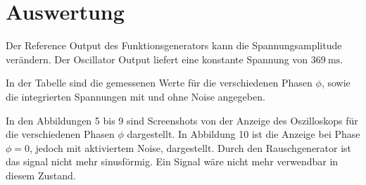 \section{Auswertung}
\label{sec:Auswertung}

Der Reference Output des Funktionsgenerators kann die Spannungsamplitude verändern. Der Oscillator Output liefert
eine konstante Spannung von $\SI{369}{\milli\s}$.\\

\begin{table}
    \centering
    
    \caption{In der Tabelle sind die gemessenen Werte für die verschiedenen Phasen $\phi$, sowie die integrierten Spannungen mit und ohne Noise angegeben.}
\end{table}
In den Abbildungen 5 bis 9 sind Screenshots von der Anzeige des Oszilloskops für die verschiedenen Phasen $\phi$ dargestellt. In Abbildung 10 ist
die Anzeige bei Phase $\phi = 0$, jedoch mit aktiviertem Noise, dargestellt. Durch den Rauschgenerator ist das signal nicht mehr sinusförmig. Ein Signal wäre nicht mehr verwendbar in diesem Zustand.\\
